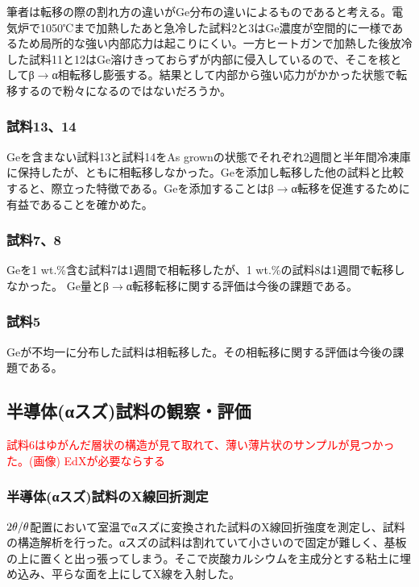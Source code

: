 筆者は転移の際の割れ方の違いがGe分布の違いによるものであると考える。電気炉で1050℃まで加熱したあと急冷した試料2と3はGe濃度が空間的に一様であるため局所的な強い内部応力は起こりにくい。一方ヒートガンで加熱した後放冷した試料11と12はGe溶けきっておらずが内部に侵入しているので、そこを核としてβ$\to$α相転移し膨張する。結果として内部から強い応力がかかった状態で転移するので粉々になるのではないだろうか。

\subsubsection{試料13、14}
Geを含まない試料13と試料14をAs grownの状態でそれぞれ2週間と半年間冷凍庫に保持したが、ともに相転移しなかった。Geを添加し転移した他の試料と比較すると、際立った特徴である。Geを添加することはβ$\to$α転移を促進するために有益であることを確かめた。

\subsubsection{試料7、8}
Geを1 wt.\%含む試料7は1週間で相転移したが、1 wt.\%の試料8は1週間で転移しなかった。
Ge量とβ$\to$α転移転移に関する評価は今後の課題である。

\subsubsection{試料5}
Geが不均一に分布した試料は相転移した。その相転移に関する評価は今後の課題である。

\subsection{半導体(αスズ)試料の観察・評価}

\textcolor{red}{試料6はゆがんだ層状の構造が見て取れて、薄い薄片状のサンプルが見つかった。(画像)}
\textcolor{red}{EdXが必要ならする}

\subsubsection{半導体(αスズ)試料のX線回折測定}
$\rm 2\theta/\theta$配置において室温でαスズに変換された試料のX線回折強度を測定し、試料の構造解析を行った。αスズの試料は割れていて小さいので固定が難しく、基板の上に置くと出っ張ってしまう。そこで炭酸カルシウムを主成分とする粘土に埋め込み、平らな面を上にしてX線を入射した。

